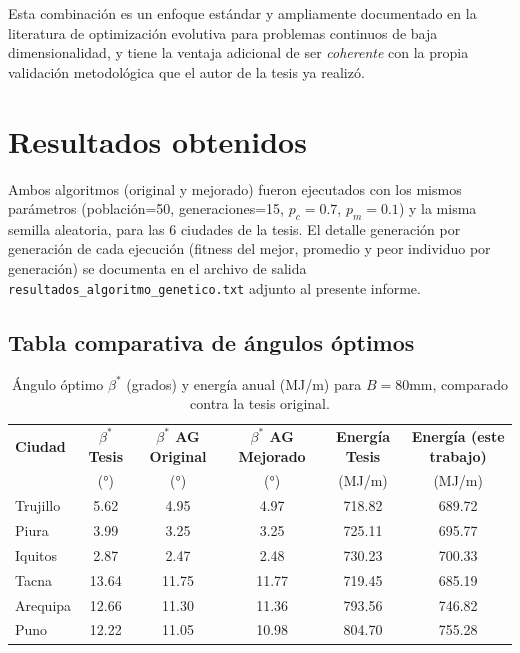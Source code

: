 \documentclass[11pt,a4paper]{article}
\begin{document}
Esta combinación es un enfoque estándar y ampliamente documentado en la
literatura de optimización evolutiva para problemas continuos de baja
dimensionalidad, y tiene la ventaja adicional de ser \emph{coherente} con la
propia validación metodológica que el autor de la tesis ya realizó.

\section{Resultados obtenidos}

Ambos algoritmos (original y mejorado) fueron ejecutados con los mismos
parámetros (población=50, generaciones=15, $p_c=0.7$, $p_m=0.1$) y la misma
semilla aleatoria, para las 6 ciudades de la tesis. El detalle generación
por generación de cada ejecución (fitness del mejor, promedio y peor
individuo por generación) se documenta en el archivo de salida
\texttt{resultados\_algoritmo\_genetico.txt} adjunto al presente informe.

\subsection{Tabla comparativa de ángulos óptimos}

\begin{table}[H]
\centering
\small
\caption{Ángulo óptimo $\beta^*$ (grados) y energía anual (MJ/m) para $B=80$mm,
comparado contra la tesis original.}
\begin{tabular}{lccccc}
\toprule
\textbf{Ciudad} & \textbf{$\beta^*$ Tesis} & \textbf{$\beta^*$ AG Original} & \textbf{$\beta^*$ AG Mejorado} & \textbf{Energía Tesis} & \textbf{Energía (este trabajo)}\\
 & (°) & (°) & (°) & (MJ/m) & (MJ/m)\\
\midrule
Trujillo  & 5.62  & 4.95  & 4.97  & 718.82 & 689.72 \\
Piura     & 3.99  & 3.25  & 3.25  & 725.11 & 695.77 \\
Iquitos   & 2.87  & 2.47  & 2.48  & 730.23 & 700.33 \\
Tacna     & 13.64 & 11.75 & 11.77 & 719.45 & 685.19 \\
Arequipa  & 12.66 & 11.30 & 11.36 & 793.56 & 746.82 \\
Puno      & 12.22 & 11.05 & 10.98 & 804.70 & 755.28 \\
\bottomrule
\end{tabular}
\end{table}
\end{document}
